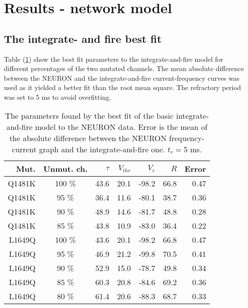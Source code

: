 \section*{Results - network model}
\subsection*{The integrate- and fire best fit}
Table (\ref{table:integrate-and-fire_parameters}) show the best fit parameters to the integrate-and-fire model for different percentages of the two mutated channels. The mean absolute difference between the NEURON and the integrate-and-fire current-frequency curves was used as it yielded a better fit than the root mean square. The refractory period was set to 5 ms to avoid overfitting.

\begin{table}
 \centering
 \caption{The parameters found by the best fit of the basic integrate-and-fire model to the NEURON data. Error is the mean of the absolute difference between the NEURON frequency-current graph and the integrate-and-fire one. $t_r=$5 ms.}
 \begin{tabular}{r|c|r|r|r|r|r} 
  Mut. & Unmut. ch. & $\tau$ & $V_{thr}$ & $V_{r}$ & $R$ & Error\\
  \hline
  Q1481K & 100 \% & 43.6 & 20.1 & -98.2 & 66.8 & 0.47\\
  Q1481K &  95 \% & 36.4 & 11.6 & -80.1 & 38.7 & 0.36\\
  Q1481K &  90 \% & 48.9 & 14.6 & -81.7 & 48.8 & 0.28\\
  Q1481K &  85 \% & 43.8 & 10.9 & -83.0 & 36.4 & 0.22\\
  \hline
  L1649Q & 100 \% & 43.6 & 20.1 & -98.2 & 66.8 & 0.47\\
  L1649Q &  95 \% & 46.9 & 21.2 & -99.8 & 70.5 & 0.41\\
  L1649Q &  90 \% & 52.9 & 15.0 & -78.7 & 49.8 & 0.34\\
  L1649Q &  85 \% & 60.3 & 20.8 & -84.6 & 69.2 & 0.36\\
  L1649Q &  80 \% & 61.4 & 20.6 & -88.3 & 68.7 & 0.33\\
 \end{tabular}
\label{table:integrate-and-fire_parameters}
\end{table}